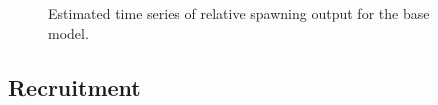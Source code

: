 \documentclass[
]{scrartcl}
\begin{document}
\endgroup

\begin{figure}[H]


\caption{\label{fig-es-sb}Estimated time series of relative spawning
output for the base model.}

\end{figure}%

\clearpage

\subsection*{Recruitment}\label{recruitment}

\begingroup
\fontsize{9.0pt}{10.8pt}\selectfont
\end{document}
